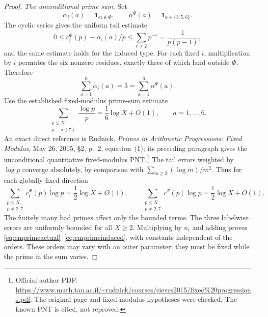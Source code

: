 \begin{proof}
\emph{The unconditional prime sum.}
Set
\[
 \alpha_i(a)=\mathbf1_{ai\notin\Phi},\qquad
 \alpha^\Psi(a)=\mathbf1_{a\in\{3,5,6\}}.
\]
The cyclic series gives the uniform tail estimate
\[
 0\le c_i^\Phi(p)-\alpha_i(a)/p
       \le\sum_{r\ge2}p^{-r}=\frac1{p(p-1)},
\]
and the same estimate holds for the induced type.
For each fixed $i$, multiplication by $i$ permutes the six nonzero residues, exactly three of which land outside $\Phi$. Therefore
\[
 \sum_{a=1}^6\alpha_i(a)=3
       =\sum_{a=1}^6\alpha^\Psi(a).
\]
Use the established fixed-modulus prime-sum estimate
\begin{equation}\label{eq:cmprimeAP}
 \sum_{\substack{p\le X\\p\equiv a\ (7)}}\frac{\log p}{p}
       =\frac16\log X+O(1),\qquad a=1,\ldots,6.
\end{equation}
An exact direct reference is Rudnick, \emph{Primes in Arithmetic Progressions: Fixed Modulus}, May 26, 2015, \S2, p.~2, equation~(1); its preceding paragraph gives the unconditional quantitative fixed-modulus PNT.\footnote{Official author PDF: \url{https://www.math.tau.ac.il/~rudnick/courses/sieves2015/fixed\%20progressions.pdf}. The original page and fixed-modulus hypotheses were checked. The known PNT is cited, not reproved.}
The tail errors weighted by $\log p$ converge absolutely, by comparison with $\sum_{m\ge2}(\log m)/m^2$. Thus for each globally fixed direction
\[
 \sum_{\substack{p\le X\\p\ne2,7}}c_i^\Phi(p)\log p
       =\frac12\log X+O(1),\qquad
 \sum_{\substack{p\le X\\p\ne2,7}}c^\Psi(p)\log p
       =\frac12\log X+O(1).
\]
The finitely many bad primes affect only the bounded terms.
The three labelwise errors are uniformly bounded for all $X\ge2$.
Multiplying by $n_i$ and adding proves
\eqref{eq:cmprimeactual}--\eqref{eq:cmprimeinduced}, with constants independent of the orders. These orders may vary with an outer parameter; they must be fixed while the prime in the sum varies.


\end{proof}
